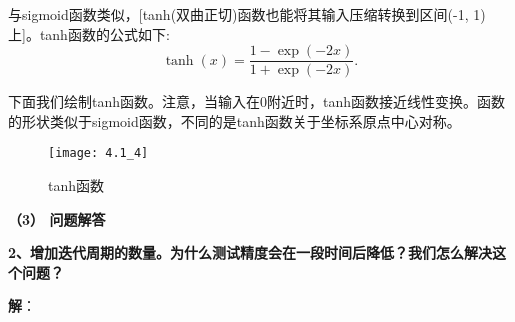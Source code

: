 \documentclass[UTF8]{ctexart}
\begin{document}
	与sigmoid函数类似，[tanh(双曲正切)函数也能将其输入压缩转换到区间(-1, 1)上]。tanh函数的公式如下:
	$$
	\tanh(x) = \frac{1 - \exp(-2x)}{1 + \exp(-2x)}.
	$$
	
	下面我们绘制tanh函数。注意，当输入在0附近时，tanh函数接近线性变换。函数的形状类似于sigmoid函数，不同的是tanh函数关于坐标系原点中心对称。
	\begin{figure}[H]
		\centering
		\texttt{[image: 4.1\_4]}
		\caption{tanh函数}
		\label{fig:4}
	\end{figure}
	
	\newpage
	\textbf{（3） 问题解答}
	
	\textbf{2、增加迭代周期的数量。为什么测试精度会在一段时间后降低？我们怎么解决这个问题？}
	
	\noindent \textbf{解}：
	
\end{document}
